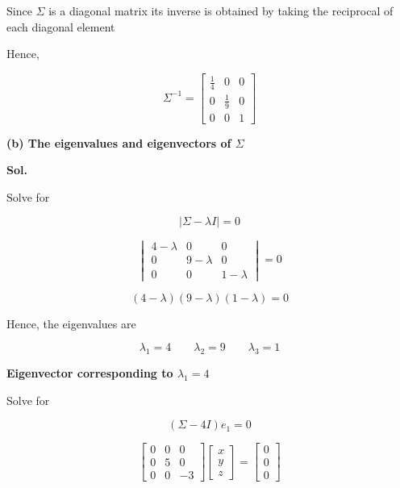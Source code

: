 \documentclass[12pt]{article}
\begin{document}
\noindent
Since \(\Sigma\) is a diagonal matrix its inverse is obtained by taking the reciprocal of each diagonal element

\vspace{0.3cm}

\noindent
Hence,

\[
\boxed{
\Sigma^{-1}
=
\begin{bmatrix}
\frac{1}{4} & 0 & 0\\
0 & \frac{1}{9} & 0\\
0 & 0 & 1
\end{bmatrix}
}
\]

\vspace{1cm}

\noindent
\textbf{(b) The eigenvalues and eigenvectors of \(\Sigma\)}

\vspace{0.5cm}

\noindent
\textbf{Sol.}

\vspace{0.3cm}

\noindent
Solve for

\[
|\Sigma-\lambda I|=0
\]

\[
\begin{vmatrix}
4-\lambda & 0 & 0\\
0 & 9-\lambda & 0\\
0 & 0 & 1-\lambda
\end{vmatrix}
=
0
\]

\[
(4-\lambda)(9-\lambda)(1-\lambda)=0
\]

\noindent
Hence, the eigenvalues are

\[
\boxed{
\lambda_1=4
\qquad
\lambda_2=9
\qquad
\lambda_3=1
}
\]

\vspace{0.5cm}

\noindent
\textbf{Eigenvector corresponding to \(\lambda_1=4\)}

\vspace{0.3cm}

\noindent
Solve for

\[
(\Sigma-4I)e_1=0
\]

\[
\begin{bmatrix}
0 & 0 & 0\\
0 & 5 & 0\\
0 & 0 & -3
\end{bmatrix}
\begin{bmatrix}
x\\
y\\
z
\end{bmatrix}
=
\begin{bmatrix}
0\\
0\\
0
\end{bmatrix}
\]
\end{document}
